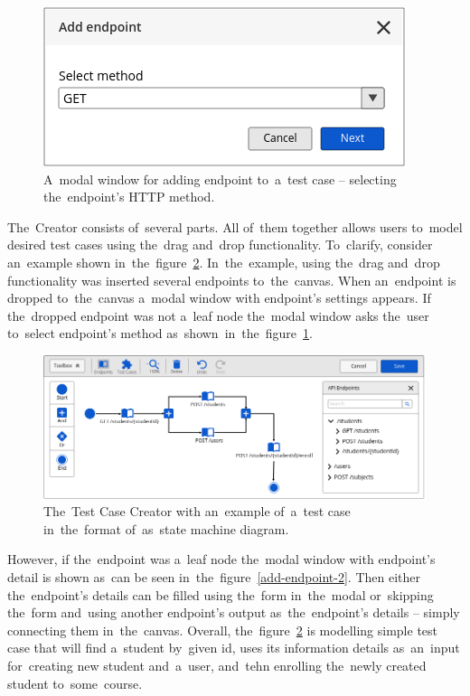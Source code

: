\begin{figure}[!hbt]
	\centering
	\includegraphics[scale=0.4]{./designs/drafts-1.0/add-endpoint-1.png}
	\caption{A~modal window for adding endpoint to~a~test case -- selecting
	the~endpoint's HTTP method.}
	\label{add-endpoint-1}
\end{figure}

The~Creator consists of~several parts. All of~them together allows users
to~model desired test cases using the~drag and~drop functionality. To~clarify,
consider an~example shown in~the~figure~\ref{test-case-creator}. In~the~example,
using the~drag and~drop functionality was inserted several endpoints
to~the~canvas. When an~endpoint is dropped to~the~canvas a~modal window with
endpoint's settings appears. If the~dropped endpoint was not a~leaf node
the~modal window asks the~user to~select endpoint's method
as~shown~in~the~figure~\ref{add-endpoint-1}.

\begin{figure}[!hbt]
	\centering
	\includegraphics[scale=0.4]{./designs/drafts-1.0/test-case-creator.png}
	\caption{The~Test Case Creator with an~example of~a~test case in~the~format
	of~as~state machine diagram.}
	\label{test-case-creator}
\end{figure}

However, if the~endpoint was a~leaf node the~modal window with endpoint's detail
is shown as~can be seen in~the~figure~\ref{add-endpoint-2}. Then either
the~endpoint's details can be filled using the~form in~the~modal or~skipping
the~form and~using another endpoint's output as~the~endpoint's details -- simply
connecting them in~the~canvas. Overall, the~figure~\ref{test-case-creator} is
modelling simple test case that will find a~student by~given id, uses its
information details as~an~input for~creating new student and~a~user, and~tehn
enrolling the~newly created student to~some~course.

